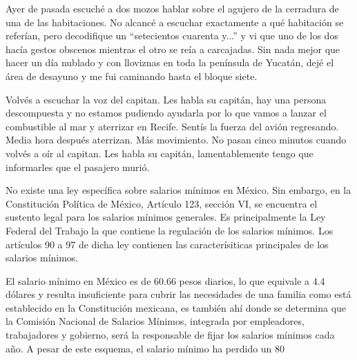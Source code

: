 \documentclass[11pt,twoside,openright,a6paper]{book}
\begin{document}
Ayer de pasada escuché a dos mozos hablar sobre el agujero de la cerradura de
una de las habitaciones. No alcancé a escuchar exactamente a qué habitación
se referían, pero decodifique un “setecientos cuarenta y...” y vi que uno
de los dos hacía gestos obscenos mientras el otro se reía a carcajadas. Sin
nada mejor que hacer un día nublado y con lloviznas en toda la península de
Yucatán, dejé el área de desayuno y me fui caminando hasta el bloque siete.


\vspace{0.5cm}
\hrulefill\hspace{0.2cm} \decofourleft\decofourright \hspace{0.2cm} \hrulefill
\vspace{0.5cm}

Volvés a escuchar la voz del capitan. Les habla su capitán, hay una
persona descompuesta y no estamos pudiendo ayudarla por lo que vamos a
lanzar el combustible al mar y aterrizar en Recife. Sentís la fuerza del
avión regresando. Media hora después aterrizan. Más movimiento. No pasan
cinco minutos cuando volvés a oír al capitan. Les habla su capitán,
lamentablemente tengo que informarles que el pasajero murió.


\vspace{0.5cm}
\hrulefill\hspace{0.2cm} \decofourleft\decofourright \hspace{0.2cm} \hrulefill
\vspace{0.5cm}

No existe una ley específica sobre salarios mínimos en México. Sin
embargo, en la Constitución Política de México, Artículo 123, sección
VI, se encuentra el sustento legal para los salarios mínimos generales. Es
principalmente  la Ley Federal del Trabajo la que contiene la regulación
de los salarios mínimos. Los artículos 90 a 97 de dicha ley contienen
las caracterísiticas principales de los salarios mínimos.

El salario mínimo en México es de 60.66 pesos diarios, lo que equivale
a 4.4 dólares y resulta insuficiente para cubrir las necesidades de una
familia como está establecido en la Constitución mexicana, es también
ahí donde se determina que la Comisión Nacional de Salarios Mínimos,
integrada por empleadores, trabajadores y gobierno, será la responsable de
fijar los salarios mínimos cada año. A pesar de este esquema, el salario
mínimo ha perdido un 80%
\end{document}
